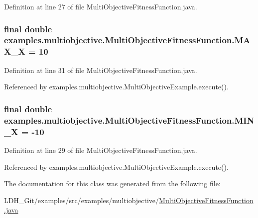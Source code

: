 Definition at line 27 of file Multi\-Objective\-Fitness\-Function.\-java.

\hypertarget{classexamples_1_1multiobjective_1_1_multi_objective_fitness_function_a039b662c49738b20f0ca7e8c87550f4f}{
\subsubsection[{M\-A\-X\-\_\-\-X}]{\setlength{\rightskip}{0pt plus 5cm}final double examples.\-multiobjective.\-Multi\-Objective\-Fitness\-Function.\-M\-A\-X\-\_\-\-X = 10\hspace{0.3cm}{\ttfamily [static]}}}\label{classexamples_1_1multiobjective_1_1_multi_objective_fitness_function_a039b662c49738b20f0ca7e8c87550f4f}


Definition at line 31 of file Multi\-Objective\-Fitness\-Function.\-java.



Referenced by examples.\-multiobjective.\-Multi\-Objective\-Example.\-execute().

\hypertarget{classexamples_1_1multiobjective_1_1_multi_objective_fitness_function_ab01dfcf9674d7fe1baff858ce700e48c}{
\subsubsection[{M\-I\-N\-\_\-\-X}]{\setlength{\rightskip}{0pt plus 5cm}final double examples.\-multiobjective.\-Multi\-Objective\-Fitness\-Function.\-M\-I\-N\-\_\-\-X = -\/10\hspace{0.3cm}{\ttfamily [static]}}}\label{classexamples_1_1multiobjective_1_1_multi_objective_fitness_function_ab01dfcf9674d7fe1baff858ce700e48c}


Definition at line 29 of file Multi\-Objective\-Fitness\-Function.\-java.



Referenced by examples.\-multiobjective.\-Multi\-Objective\-Example.\-execute().



The documentation for this class was generated from the following file\-:\begin{DoxyCompactItemize}
\item 
L\-D\-H\-\_\-\-Git/examples/src/examples/multiobjective/\hyperlink{_multi_objective_fitness_function_8java}{Multi\-Objective\-Fitness\-Function.\-java}\end{DoxyCompactItemize}
